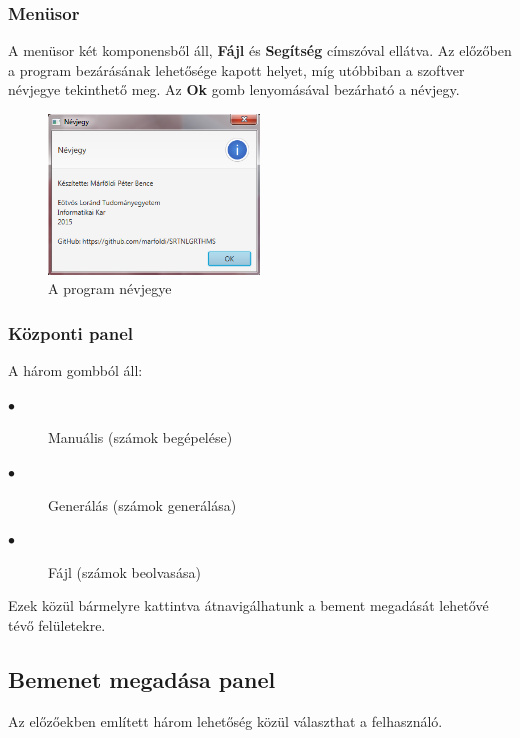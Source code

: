 \documentclass{elteikthesis}
\begin{document}
\subsubsection{Menüsor}
A menüsor két komponensből áll, \textbf{Fájl} és \textbf{Segítség} címszóval ellátva. Az előzőben a program bezárásának lehetősége kapott helyet, míg utóbbiban a szoftver névjegye tekinthető meg. Az \textbf{Ok} gomb lenyomásával bezárható a névjegy.
\begin{figure}[H]
	\centering
	\includegraphics[width=0.5\textwidth]{pics/about.png}
	\caption{A program névjegye}
\end{figure}

\subsubsection{Központi panel}
A három gombból áll:
\begin{description}
	\item[$\bullet$] Manuális (számok begépelése)
	\item[$\bullet$] Generálás (számok generálása) 
	\item[$\bullet$] Fájl (számok beolvasása)
\end{description}
Ezek közül bármelyre kattintva átnavigálhatunk a bement megadását lehetővé tévő felületekre.

\subsection{Bemenet megadása panel}
Az előzőekben említett három lehetőség közül választhat a felhasználó.
\end{document}
